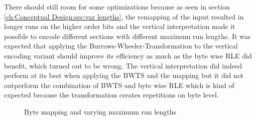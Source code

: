 \par{
There should still room for some optimizations because as seen in section \ref{ch:Conceptual Design:sec:var lengths}, the remapping of the input resulted in longer runs on the higher order bits and the vertical interpretation made it possible to encode different sections with different maximum run lengths. It was expected that applying the Burrows-Wheeler-Transformation to the vertical encoding variant should improve its efficiency as much as the byte wise RLE did benefit, which turned out to be wrong. The vertical interpretation did indeed perform at its best when applying the BWTS and the mapping but it did not outperform the combination of BWTS and byte wise RLE which is kind of expected because the transformation creates repetitions on byte level.

\begin{figure}[h]
	\caption{Byte mapping and varying maximum run lengths}
	\label{fig:3:Different run lengths with and without transformations}
\end{figure}

}
